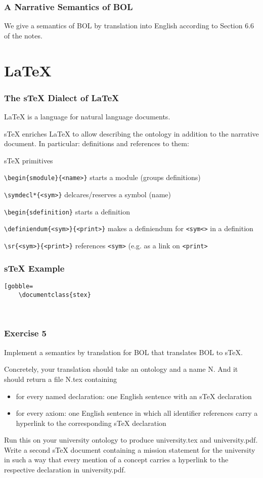 \begin{frame}\frametitle{A Narrative Semantics of BOL}
We give a semantics of BOL by translation into English according to Section 6.6 of the notes.
\end{frame}

\section{LaTeX}

\begin{frame}[fragile]\frametitle{The sTeX Dialect of LaTeX}
  \lstset{language=[LaTeX]TeX}
LaTeX is a language for natural language documents.

sTeX enriches LaTeX to allow describing the ontology in addition to the narrative document.
In particular: definitions and references to them:

\begin{blockitems}{sTeX primitives}
 \item \lstinline|\begin{smodule}{<name>}| starts a module (groups definitions)
\item \lstinline|\symdecl*{<sym>}| delcares/reserves a symbol (name)
\item \lstinline|\begin{sdefinition}| starts a definition
\item \lstinline|\definiendum{<sym>}{<print>}| makes a definiendum for \lstinline|<sym<>|
  in a definition 
\item \lstinline|\sr{<sym>}{<print>}| references \lstinline|<sym>| (e.g. as a link on
  \lstinline|<print>|
\end{blockitems}
\end{frame}

\begin{frame}
  \lstset{language=[LaTeX]TeX}
  \frametitle{sTeX Example}
  \begin{lstlisting}[gobble=
    \documentclass{stex}
    
    
  \end{lstlisting}
\end{frame}

\begin{frame}\frametitle{Exercise 5}
Implement a semantics by translation for BOL that translates BOL to sTeX.

Concretely, your translation should take an ontology and a name N.
And it should return a file N.tex containing
\begin{itemize}
 \item for every named declaration: one English sentence with an sTeX declaration
 \item for every axiom: one English sentence in which all identifier references carry a hyperlink to the corresponding sTeX declaration
\end{itemize}

Run this on your university ontology to produce university.tex and university.pdf.
Write a second sTeX document containing a mission statement for the university in such a way that every mention of a concept carries a hyperlink to the respective declaration in university.pdf.
\end{frame}
